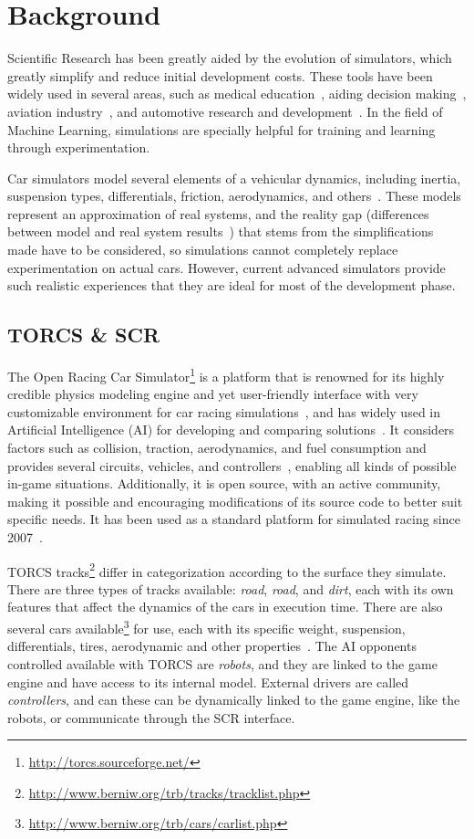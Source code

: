 \section{Background}\label{sec:2}

Scientific Research has been greatly aided by the evolution of simulators, which greatly simplify and reduce initial development costs. These tools have been widely used in several areas, such as medical education~\cite{MEDIC}, aiding decision making~\cite{useOfSimulaton2002}, aviation industry~\cite{AIR}, and automotive research and development~\cite{AUTR}. In the field of Machine Learning, simulations are specially helpful for training and learning through experimentation.

Car simulators model several elements of a vehicular dynamics, including inertia, suspension types, differentials, friction, aerodynamics, and others~\cite{SIMUTORCS}. These models represent an approximation of real systems, and the reality gap (differences between model and real system results~\cite{brookes2012authentic}) that stems from the simplifications made have to be considered, so simulations cannot completely replace experimentation on actual cars. However, current advanced simulators provide such realistic experiences that they are ideal for most of the development phase.

\subsection{TORCS \& SCR}
The Open Racing Car Simulator\footnote{\url{http://torcs.sourceforge.net/}} is a platform that is renowned for its highly credible physics modeling engine and yet user-friendly interface with very customizable environment for car racing simulations~\cite{SIMUTORCS,SCR}, and has widely used in Artificial Intelligence (AI) for developing and comparing solutions~\cite{2009}. It considers factors such as collision, traction, aerodynamics, and fuel consumption and provides several circuits, vehicles, and controllers~\cite{2009,Loiacono:2012:LEA:2212908.2212953}, enabling all kinds of possible in-game situations. Additionally, it is open source, with an active community, making it possible and encouraging modifications of its source code to better suit specific needs. It has been used as a standard platform for simulated racing since 2007~\cite{Loiacono:2012:LEA:2212908.2212953}.

TORCS tracks\footnote{\url{http://www.berniw.org/trb/tracks/tracklist.php}} differ in categorization according to the surface they simulate. There are three types of tracks available: \emph{road}, \emph{road}, and \emph{dirt}, each with its own features that affect the dynamics of the cars in execution time. There are also several cars available\footnote{\url{http://www.berniw.org/trb/cars/carlist.php}} for use, each with its specific weight, suspension, differentials, tires, aerodynamic and other properties~\cite{SIMUTORCS}. The AI opponents controlled available with TORCS are \emph{robots}, and they are linked to the game engine and have access to its internal model. External drivers are called \emph{controllers}, and can these can be dynamically linked to the game engine, like the robots, or communicate through the SCR interface.

